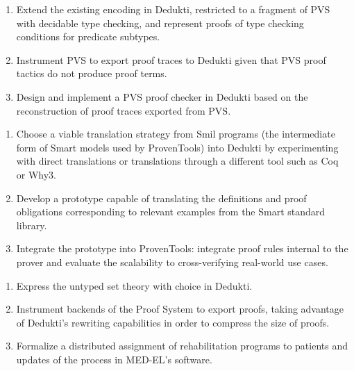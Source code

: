 \begin{workpackage}
\begin{tasklist}
\begin{task}[id=pvs,
  title=Express the theory of PVS in Dedukti,
  lead=Inr,   %
  InrRM=20,  %
  wphases=1-48,
  ]
  \begin{enumerate}
  \item Extend the existing encoding in Dedukti,
    restricted to a fragment of PVS with decidable type checking, and represent
    proofs of type checking conditions for predicate subtypes.
  \item Instrument PVS to export proof traces to Dedukti given that PVS proof
    tactics do not produce proof terms.
  \item Design and implement a PVS proof checker in Dedukti based on the
    reconstruction of proof traces exported from PVS.
  \end{enumerate}
\end{task}

\begin{task}[id=smart,
  title=Express \textsf{Smart} models and proofs in Dedukti,
  lead=Pro,   %
  ProRM=11,
  wphases=1-48,
  ]
  \begin{enumerate}
  \item Choose a viable translation strategy from \textsf{Smil} programs (the
    intermediate form of \textsf{Smart} models used by ProvenTools) into Dedukti
    by experimenting with direct translations or translations through a
    different tool such as Coq or Why3.
  \item Develop a prototype capable of translating the definitions and proof
    obligations corresponding to relevant examples from the \textsf{Smart}
    standard library.
  \item Integrate the prototype into ProvenTools: integrate proof rules internal
    to the prover and evaluate the scalability to cross-verifying real-world use
    cases.
  \end{enumerate}
\end{task}

\begin{task}[id=tla,
  title=Express the theory of \tlaplus in Dedukti,
  lead=Inr,   %
  InrRM=21,   %
  MedRM=4,
  wphases=1-48,
  ]
  \begin{enumerate}
  \item Express the untyped \tlaplus set theory with choice in
    Dedukti.
  \item Instrument backends of the \tlaplus Proof System to export proofs,
    taking advantage of Dedukti's rewriting capabilities in order to compress
    the size of proofs.
  \item Formalize a distributed assignment of rehabilitation programs to
    patients and updates of the process in MED-EL's software.
  \end{enumerate}
\end{task}


\end{tasklist}
\end{workpackage}
